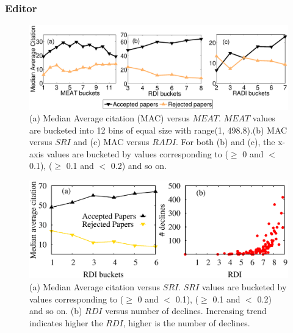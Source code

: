 \noindent
\subsubsection{Editor}
\label{editor}   

\begin{figure}
\centering
\includegraphics*[width=.8\textwidth]{./texfiles/Chapter_4/cikm/figures/editor_all.eps}
\caption{\label{fig3}(a) Median Average citation (MAC) versus $MEAT$. $MEAT$ values are bucketed into 12 bins of equal size with range(1, 498.8).(b) MAC versus $SRI$ and (c) MAC versus $RADI$. For both (b) and (c), the x-axis values are bucketed by values corresponding to ($\geq$ 0 and $<$ 0.1), ($\geq$ 0.1 and $<$ 0.2) and so on.}
\vspace{3mm}
\end{figure}

\begin{figure}[!ht]
\centering
\includegraphics[scale=0.3]{./texfiles/Chapter_4/cikm/figures/RDI_RDI_diversity.eps}
\caption{\label{fig_sri} (a) Median Average citation versus $SRI$. $SRI$ values are bucketed by values corresponding to ($\geq$ 0 and $<$ 0.1), ($\geq$ 0.1 and $<$ 0.2) and so on. (b) $RDI$ versus number of declines. Increasing trend indicates higher the $RDI$, higher is the number of declines.}
\vspace{3mm}
\end{figure}

